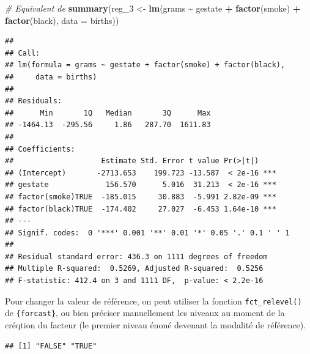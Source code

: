 \documentclass[
  11pt,
]{book}
\newenvironment{Shaded}{\begin{snugshade}}{\end{snugshade}}
\newcommand{\CommentTok}[1]{\textcolor[rgb]{0.56,0.35,0.01}{\textit{#1}}}
\newcommand{\DataTypeTok}[1]{\textcolor[rgb]{0.13,0.29,0.53}{#1}}
\newcommand{\DecValTok}[1]{\textcolor[rgb]{0.00,0.00,0.81}{#1}}
\newcommand{\KeywordTok}[1]{\textcolor[rgb]{0.13,0.29,0.53}{\textbf{#1}}}
\newcommand{\NormalTok}[1]{#1}
\newcommand{\OperatorTok}[1]{\textcolor[rgb]{0.81,0.36,0.00}{\textbf{#1}}}
\newcommand{\StringTok}[1]{\textcolor[rgb]{0.31,0.60,0.02}{#1}}
\numberwithin{equation}{section}
\numberwithin{countremarque}{section}
\begin{document}
\begin{Shaded}
\begin{Highlighting}[]
\CommentTok{\# Equivalent de }
\KeywordTok{summary}\NormalTok{(reg\_}\DecValTok{3}\NormalTok{ \textless{}{-}}\StringTok{ }
\StringTok{          }\KeywordTok{lm}\NormalTok{(grams }\OperatorTok{\textasciitilde{}}\StringTok{ }\NormalTok{gestate }\OperatorTok{+}\StringTok{ }\KeywordTok{factor}\NormalTok{(smoke) }\OperatorTok{+}\StringTok{ }\KeywordTok{factor}\NormalTok{(black),}
             \DataTypeTok{data =}\NormalTok{ births))}
\end{Highlighting}
\end{Shaded}

\begin{lstlisting}
## 
## Call:
## lm(formula = grams ~ gestate + factor(smoke) + factor(black), 
##     data = births)
## 
## Residuals:
##      Min       1Q   Median       3Q      Max 
## -1464.13  -295.56     1.86   287.70  1611.83 
## 
## Coefficients:
##                    Estimate Std. Error t value Pr(>|t|)    
## (Intercept)       -2713.653    199.723 -13.587  < 2e-16 ***
## gestate             156.570      5.016  31.213  < 2e-16 ***
## factor(smoke)TRUE  -185.015     30.883  -5.991 2.82e-09 ***
## factor(black)TRUE  -174.402     27.027  -6.453 1.64e-10 ***
## ---
## Signif. codes:  0 '***' 0.001 '**' 0.01 '*' 0.05 '.' 0.1 ' ' 1
## 
## Residual standard error: 436.3 on 1111 degrees of freedom
## Multiple R-squared:  0.5269, Adjusted R-squared:  0.5256 
## F-statistic: 412.4 on 3 and 1111 DF,  p-value: < 2.2e-16
\end{lstlisting}

Pour changer la valeur de référence, on peut utiliser la fonction \texttt{fct\_relevel()} de \texttt{\{forcast\}}, ou bien préciser manuellement les niveaux au moment de la créqtion du facteur (le premier niveau énoné devenant la modalité de référence).

\begin{Shaded}
\end{Shaded}

\begin{lstlisting}
## [1] "FALSE" "TRUE"
\end{lstlisting}
\end{document}
